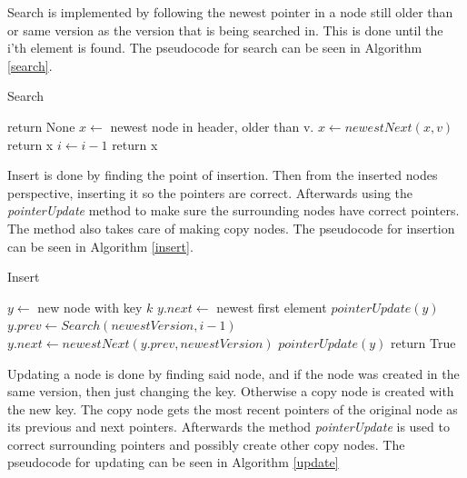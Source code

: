 \documentclass[12pt, a4paper]{article}
\begin{document}
\medskip
Search is implemented by following the newest pointer in a node still older 
than or same version as the version that is being searched in. This is done until 
the i'th element is found. The pseudocode for search can be seen in Algorithm \ref{search}.

\begin{algorithm}
\caption{Search}\label{search}
\begin{algorithmic}[1]
        \State return None
    \EndIf
    \State $x \gets $ newest node in header, older than v. 
        \State $x \gets newestNext(x,v)$
            \State return x
        \EndIf
        \State $i \gets i-1$
    \EndWhile
    \State return x
\EndProcedure
\end{algorithmic}
\end{algorithm}

\medskip
Insert is done by finding the point of insertion. Then from the inserted 
nodes perspective, inserting it so the pointers are correct. Afterwards 
using the {\it pointerUpdate} method to make sure the surrounding nodes have 
correct pointers. The method also takes care of making copy nodes. The 
pseudocode for insertion can be seen in Algorithm \ref{insert}.

\begin{algorithm}
\caption{Insert}\label{insert}
\begin{algorithmic}[1]
    \State $y \gets$ new node with key $k$
        \State $y.next \gets$ newest first element
        \State $pointerUpdate(y)$
    \Else
        \State $y.prev \gets Search(newestVersion, i-1)$
        \State $y.next \gets newestNext(y.prev, newestVersion)$
        \State $pointerUpdate(y)$
    \EndIf
    \State return True
\EndProcedure
\end{algorithmic}
\end{algorithm}

\medskip
Updating a node is done by finding said node, and if the node was created in
the same version, then just changing the key. Otherwise a copy node is created
with the new key. The copy node gets the most recent pointers of the original node
as its previous and next pointers. Afterwards the method {\it pointerUpdate} is used
to correct surrounding pointers and possibly create other copy nodes. 
The pseudocode for updating can be seen in Algorithm \ref{update}
\end{document}
